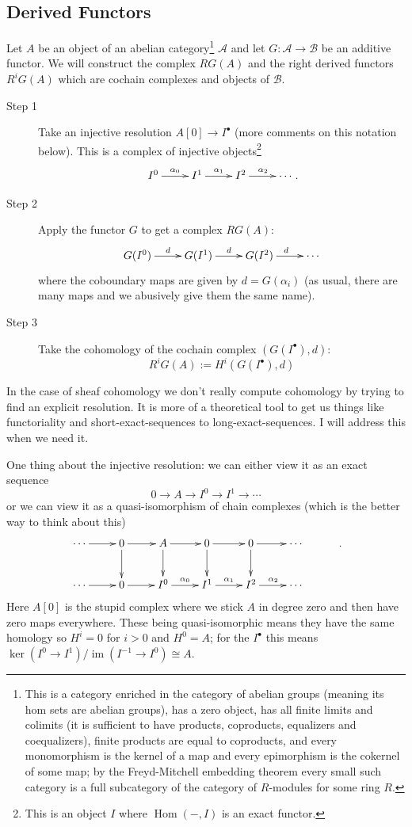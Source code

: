 \documentclass[12pt]{article}
\numberwithin{equation}{section}
\theoremstyle{definition}
\theoremstyle{remark}
\newcommand{\Hom}{\operatorname{Hom}}
\newcommand{\im}{\operatorname{im}}
\begin{document}
\subsection{Derived Functors}
Let $A$ be an object of an abelian category\footnote{
This is a category enriched in the category of abelian groups (meaning its hom sets are abelian groups), has a zero object, has all finite limits and colimits (it is sufficient to have products, coproducts, equalizers and coequalizers), finite products are equal to coproducts, and every monomorphism is the kernel of a map and every epimorphism is the cokernel of some map; by the Freyd-Mitchell embedding theorem every small such category is a full subcategory of the category of $R$-modules for some ring $R$. 
} $\mathcal{A}$ and let $G: \mathcal{A} \to \mathcal{B}$ be an additive functor. 
We will construct the complex $RG(A)$ and the right derived functors $R^iG(A)$ which are cochain complexes and objects of $\mathcal{B}$. 
\begin{description}
	\item[Step 1] Take an injective resolution $A[0] \to I^{\bullet}$ (more comments on this notation below).
	This is a complex of injective objects\footnote{This is an object $I$ where $\Hom(-,I)$ is an exact functor. }
	$$
	\xymatrix{
	 I^0 \ar[r]^{\alpha_0} & I^1 \ar[r]^{\alpha_1} & I^2 \ar[r]^{\alpha_2} & \cdots 
	}.$$
	\item[Step 2] Apply the functor $G$ to get a complex $RG(A)$:
	$$
\xymatrix{
	G(I^0) \ar[r]^{d} & G(I^1) \ar[r]^{d} & G(I^2) \ar[r]^{d} & \cdots 
}$$
where the coboundary maps are given by $d=G(\alpha_i)$ (as usual, there are many maps and we abusively give them the same name).
	\item[Step 3] Take the cohomology of the cochain complex $(G(I^{\bullet}), d)$:
	  $$ R^iG(A) := H^i( G(I^{\bullet}),d)$$
\end{description}
In the case of sheaf cohomology we don't really compute cohomology by trying to find an explicit resolution. It is more of a theoretical tool to get us things like functoriality and short-exact-sequences to long-exact-sequences.
I will address this when we need it.

One thing about the injective resolution: we can either view it as an exact sequence
 $$ 0 \to A \to I^0 \to I^1 \to \cdots $$
or we can view it as a quasi-isomorphism of chain complexes (which is the better way to think about this)
	$$
\xymatrix{
	\cdots \ar[r] & 0 \ar[d] \ar[r]& A \ar[d]\ar[r] & 0 \ar[r] \ar[d] & 0 \ar[d] \ar[r] & \cdots &\\
	\cdots \ar[r] & 0\ar[r]  & I^0 \ar[r]^{\alpha_0} & I^1 \ar[r]^{\alpha_1} & I^2 \ar[r]^{\alpha_2} & \cdots 
}.$$
Here $A[0]$ is the stupid complex where we stick $A$ in degree zero and then have zero maps everywhere. 
These being quasi-isomorphic means they have the same homology so $H^i=0$ for $i>0$ and $H^0=A$; for the $I^{\bullet}$ this means $\ker(I^0\to I^1)/\im(I^{-1}\to I^0) \cong A$.
\end{document}
